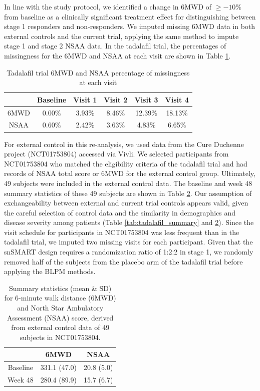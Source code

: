 In line with the study protocol, we identified a change in \ac{6MWD} of $\geqslant -10\%$ from baseline as a clinically significant treatment effect for distinguishing between stage 1 responders and non-responders. We imputed missing \ac{6MWD} data in both external controls and the current trial, applying the same method to impute stage 1 and stage 2 \ac{NSAA} data. In the tadalafil trial, the percentages of missingness for the \ac{6MWD} and \ac{NSAA} at each visit are shown in Table \ref{tab:missingness}.


\begin{table}
\caption{Tadalafil trial 6MWD and NSAA percentage of missingness at each visit \label{tab:missingness}}
\begin{center}
\begin{tabular}{cccccc}
  &  Baseline &  Visit 1 & Visit 2 & Visit 3 & Visit 4 \tabularnewline
\hline
6MWD & 0.00\% & 3.93\% & 8.46\% & 12.39\% & 18.13\% \\
NSAA & 0.60\% & 2.42\% & 3.63\% & 4.83\% & 6.65\%  \\
\hline
\end{tabular}
\end{center}
\end{table}

For external control in this re-analysis, we used data from the Cure Duchenne project (NCT01753804) accessed via Vivli. We selected participants from NCT01753804 who matched the eligibility criteria of the tadalafil trial and had records of \ac{NSAA} total score or \ac{6MWD} for the external control group. Ultimately, 49 subjects were included in the external control data. The baseline and week 48 summary statistics of these 49 subjects are shown in Table \ref{tab:cureduchenne}. Our assumption of exchangeability between external and current trial controls appears valid, given the careful selection of control data and the similarity in demographics and disease severity among patients (Table \ref{tab:tadalafil_summary} and \ref{tab:cureduchenne}). Since the visit schedule for participants in NCT01753804 was less frequent than in the tadalafil trial, we imputed two missing visits for each participant. Given that the snSMART design requires a randomization ratio of 1:2:2 in stage 1, we randomly removed half of the subjects from the placebo arm of the tadalafil trial before applying the \ac{BLPM} methods.

\begin{table}
\caption{Summary statistics (mean \& SD) for 6-minute walk distance (6MWD) and North Star Ambulatory Assessment (NSAA) score, derived from external control data of 49 subjects in NCT01753804. \label{tab:cureduchenne}}
\vspace{-2.5mm}
\begin{center}
\begin{tabular}{ccc}
& 6MWD & NSAA \\
\hline
Baseline & 331.1 (47.0) &  20.8 (5.0)\\
Week 48 & 280.4 (89.9) & 15.7 (6.7)\\
\hline
\end{tabular}
\end{center}
\end{table}

